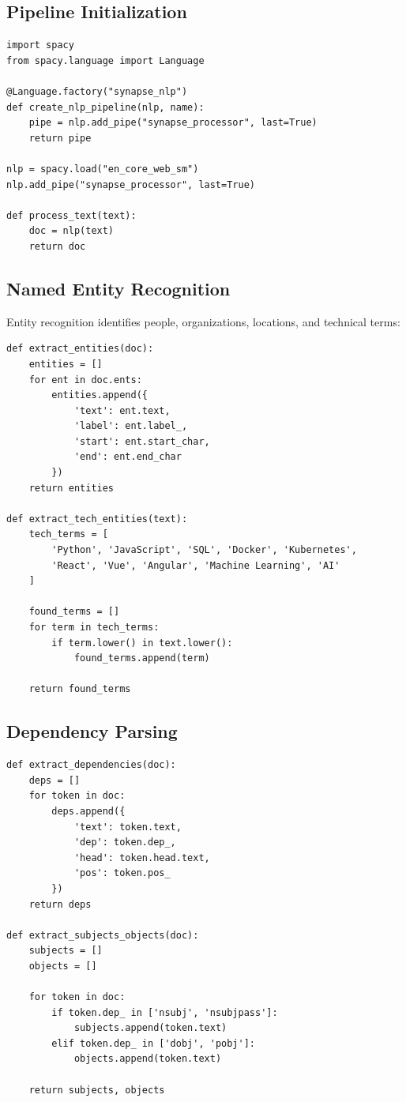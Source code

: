\documentclass[12pt,a4paper]{report}
\begin{document}
\subsection{Pipeline Initialization}

\begin{lstlisting}
import spacy
from spacy.language import Language

@Language.factory("synapse_nlp")
def create_nlp_pipeline(nlp, name):
    pipe = nlp.add_pipe("synapse_processor", last=True)
    return pipe

nlp = spacy.load("en_core_web_sm")
nlp.add_pipe("synapse_processor", last=True)

def process_text(text):
    doc = nlp(text)
    return doc
\end{lstlisting}

\subsection{Named Entity Recognition}

Entity recognition identifies people, organizations, locations, and technical terms:

\begin{lstlisting}
def extract_entities(doc):
    entities = []
    for ent in doc.ents:
        entities.append({
            'text': ent.text,
            'label': ent.label_,
            'start': ent.start_char,
            'end': ent.end_char
        })
    return entities

def extract_tech_entities(text):
    tech_terms = [
        'Python', 'JavaScript', 'SQL', 'Docker', 'Kubernetes',
        'React', 'Vue', 'Angular', 'Machine Learning', 'AI'
    ]
    
    found_terms = []
    for term in tech_terms:
        if term.lower() in text.lower():
            found_terms.append(term)
    
    return found_terms
\end{lstlisting}

\subsection{Dependency Parsing}

\begin{lstlisting}
def extract_dependencies(doc):
    deps = []
    for token in doc:
        deps.append({
            'text': token.text,
            'dep': token.dep_,
            'head': token.head.text,
            'pos': token.pos_
        })
    return deps

def extract_subjects_objects(doc):
    subjects = []
    objects = []
    
    for token in doc:
        if token.dep_ in ['nsubj', 'nsubjpass']:
            subjects.append(token.text)
        elif token.dep_ in ['dobj', 'pobj']:
            objects.append(token.text)
    
    return subjects, objects
\end{lstlisting}
\end{document}
